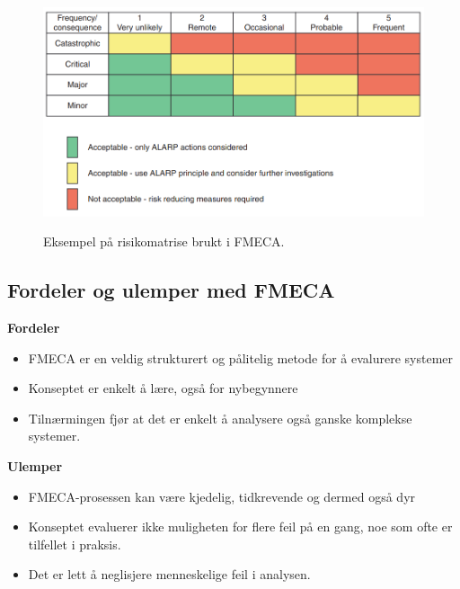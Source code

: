 \begin{figure}[H]
    \centering
        \includegraphics[width=\textwidth]{figures/FMECA/riskmat.PNG}\\
        \caption{Eksempel på risikomatrise brukt i FMECA.}
        \label{fig:riskmat}
\end{figure}

\subsection{Fordeler og ulemper med FMECA}

\textbf{Fordeler}

\begin{itemize}
    \item FMECA er en veldig strukturert og pålitelig metode for å evalurere systemer
    \item Konseptet er enkelt å lære, også for nybegynnere
    \item Tilnærmingen fjør at det er enkelt å analysere også ganske komplekse systemer.
\end{itemize}

\textbf{Ulemper}

\begin{itemize}
    \item FMECA-prosessen kan være kjedelig, tidkrevende og dermed også dyr
    \item Konseptet evaluerer ikke muligheten for flere feil på en gang, noe som ofte er
    tilfellet i praksis.
    \item Det er lett å neglisjere menneskelige feil i analysen.
\end{itemize}
